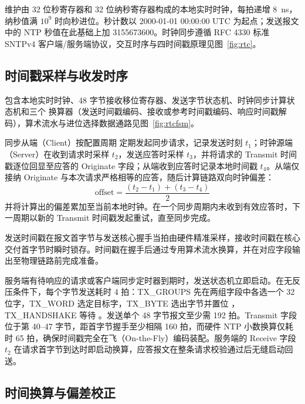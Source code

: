 维护由 32 位秒寄存器和 32 位纳秒寄存器构成的本地实时时钟，每拍递增 8~ns，纳秒值满 $10^9$ 时向秒进位。秒计数以 2000-01-01 00:00:00 UTC 为起点；发送报文中的 NTP 秒值在此基础上加 3155673600。时钟同步遵循 RFC 4330 标准 SNTPv4 客户端/服务端协议，交互时序与四时间戳原理见图~\ref{fig:rtc}。


\subsection{时间戳采样与收发时序}

 包含本地实时时钟、48 字节接收移位寄存器、发送字节状态机、时钟同步计算状态机和三个  换算器（发送时间戳编码、接收或参考时间戳编码、响应时间戳解码），算术流水与进位选择数据通路见图~\ref{fig:rtcfsm}。

同步从端（Client）按配置周期  定期发起同步请求，记录发送时刻 $t_1$；时钟源端（Server）在收到请求时采样 $t_2$，发送应答时采样 $t_3$，并将请求的 Transmit 时间戳逐位回显至应答的 Originate 字段；从端收到应答时记录本地时间戳 $t_4$。从端仅接纳 Originate 与本次请求严格相等的应答，随后计算链路双向时钟偏差：
\begin{equation}
\text{offset} = \frac{(t_2-t_1)+(t_3-t_4)}{2}
\end{equation}
并将计算出的偏差累加至当前本地时钟。在一个同步周期内未收到有效应答时，下一周期以新的 Transmit 时间戳发起重试，直至同步完成。

发送时间戳在报文首字节与发送核心握手当拍由硬件精准采样，接收时间戳在核心交付首字节时瞬时锁存。时间戳在握手后通过专用算术流水换算，并在对应字段输出至物理链路前完成准备。


服务端有待响应的请求或客户端同步定时器到期时，发送状态机立即启动。在无反压条件下，每个字节发送耗时 4 拍：TX\_GROUPS 先在两组字段中各选一个 32 位字，TX\_WORD 选定目标字，TX\_BYTE 选出字节并置位 ，TX\_HANDSHAKE 等待 。发送单个 48 字节报文至少需 192 拍。Transmit 字段位于第 40--47 字节，距首字节握手至少相隔 160 拍，而硬件 NTP 小数换算仅耗时 65 拍，确保时间戳完全在飞（On-the-Fly）编码装配。服务端的 Receive 字段 $t_2$ 在请求首字节到达时即启动换算，应答报文在整条请求校验通过后无缝启动回送。

\subsection{时间换算与偏差校正}

